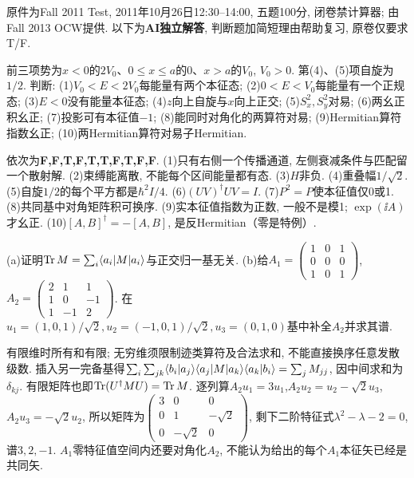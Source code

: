 原件为Fall 2011 Test, 2011年10月26日12:30--14:00, 五题100分, 闭卷禁计算器; 由Fall 2013 OCW提供. 以下为\textbf{AI独立解答}, 判断题加简短理由帮助复习, 原卷仅要求T/F.
\begin{exercise}
前三项势为$x<0$的$2V_0$、$0\leq x\leq a$的0、$x>a$的$V_0$, $V_0>0$. 第(4)、(5)项自旋为$1/2$. 判断: (1)$V_0<E<2V_0$每能量有两个本征态; (2)$0<E<V_0$每能量有一个正规态; (3)$E<0$没有能量本征态; (4)$z$向上自旋与$x$向上正交; (5)$S_x^2,S_y^2$对易; (6)两幺正积幺正; (7)投影可有本征值$-1$; (8)能同时对角化的两算符对易; (9)Hermitian算符指数幺正; (10)两Hermitian算符对易子Hermitian.
\end{exercise}
\begin{solution}
依次为\textbf{F,F,T,F,T,T,F,T,F,F}. (1)只有右侧一个传播通道, 左侧衰减条件与匹配留一个散射解. (2)束缚能离散, 不能每个区间能量都有态. (3)$H$非负. (4)重叠幅$1/\sqrt2$. (5)自旋$1/2$的每个平方都是$\hbar^2I/4$. (6)$(UV)^\dagger UV=I$. (7)$P^2=P$使本征值仅0或1. (8)共同基中对角矩阵积可换序. (9)实本征值指数为正数, 一般不是模1; $\exp(\ii A)$才幺正. (10)$[A,B]^\dagger=-[A,B]$, 是反Hermitian（零是特例）.
\end{solution}
\begin{exercise}
(a)证明$\operatorname{Tr} M=\sum_i\langle a_i\rvert M\lvert a_i\rangle$与正交归一基无关. (b)给$A_1=\left(\begin{smallmatrix}1&0&1\\0&0&0\\1&0&1\end{smallmatrix}\right)$,$A_2=\left(\begin{smallmatrix}2&1&1\\1&0&-1\\1&-1&2\end{smallmatrix}\right)$. 在$u_1=(1,0,1)/\sqrt2,u_2=(-1,0,1)/\sqrt2,u_3=(0,1,0)$基中补全$A_2$并求其谱.
\end{exercise}
\begin{solution}
有限维时所有和有限; 无穷维须限制迹类算符及合法求和, 不能直接换序任意发散级数. 插入另一完备基得$\sum_i\sum_{jk}\langle b_i\vert a_j\rangle\langle a_j\rvert M\lvert a_k\rangle\langle a_k\vert b_i\rangle=\sum_jM_{jj}$, 因中间求和为$\delta_{kj}$. 有限矩阵也即$\operatorname{Tr}(U^\dagger MU)=\operatorname{Tr} M$. 逐列算$A_2u_1=3u_1$,$A_2u_2=u_2-\sqrt2u_3$,$A_2u_3=-\sqrt2u_2$, 所以矩阵为$\left(\begin{smallmatrix}3&0&0\\0&1&-\sqrt2\\0&-\sqrt2&0\end{smallmatrix}\right)$, 剩下二阶特征式$\lambda^2-\lambda-2=0$, 谱$3,2,-1$. $A_1$零特征值空间内还要对角化$A_2$, 不能认为给出的每个$A_1$本征矢已经是共同矢.
\end{solution}
